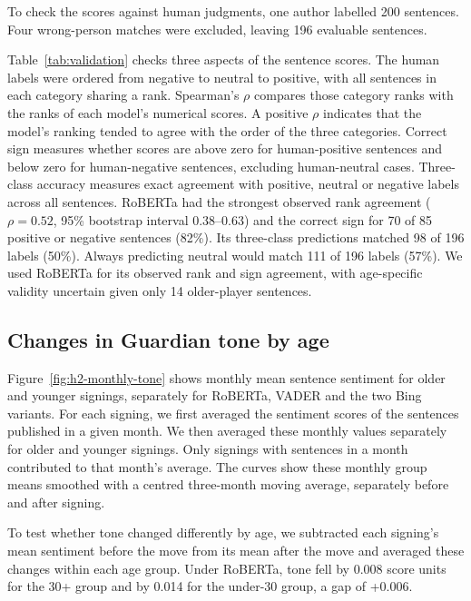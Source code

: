 To check the scores against human judgments, one author labelled 200 sentences. Four wrong-person matches were excluded, leaving 196 evaluable sentences.

Table~\ref{tab:validation} checks three aspects of the sentence scores. The human labels were ordered from negative to neutral to positive, with all sentences in each category sharing a rank. Spearman's $\rho$ compares those category ranks with the ranks of each model's numerical scores. A positive $\rho$ indicates that the model's ranking tended to agree with the order of the three categories. Correct sign measures whether scores are above zero for human-positive sentences and below zero for human-negative sentences, excluding human-neutral cases. Three-class accuracy measures exact agreement with positive, neutral or negative labels across all sentences. RoBERTa had the strongest observed rank agreement ($\rho = 0.52$, 95\% bootstrap interval 0.38--0.63) and the correct sign for 70 of 85 positive or negative sentences (82\%). Its three-class predictions matched 98 of 196 labels (50\%). Always predicting neutral would match 111 of 196 labels (57\%). We used RoBERTa for its observed rank and sign agreement, with age-specific validity uncertain given only 14 older-player sentences.



\guardianSentimentFigure
\subsection*{Changes in Guardian tone by age}

Figure~\ref{fig:h2-monthly-tone} shows monthly mean sentence sentiment for older and younger signings, separately for RoBERTa, VADER and the two Bing variants. For each signing, we first averaged the sentiment scores of the sentences published in a given month. We then averaged these monthly values separately for older and younger signings. Only signings with sentences in a month contributed to that month's average. The curves show these monthly group means smoothed with a centred three-month moving average, separately before and after signing.

To test whether tone changed differently by age, we subtracted each signing's mean sentiment before the move from its mean after the move and averaged these changes within each age group. Under RoBERTa, tone fell by 0.008 score units for the 30+ group and by 0.014 for the under-30 group, a gap of +0.006.

